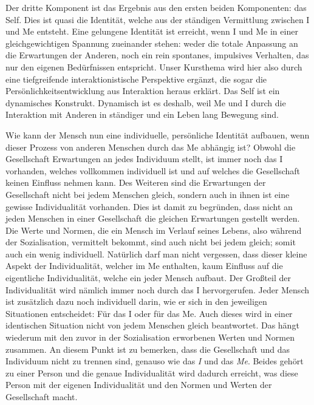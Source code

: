 Der dritte Komponent ist das Ergebnis aus den ersten beiden Komponenten: das Self.
Dies ist quasi die Identität, welche aus der ständigen Vermittlung zwischen I und Me entsteht.
Eine gelungene Identität ist erreicht, wenn I und Me in einer gleichgewichtigen Spannung zueinander stehen: weder die totale Anpassung an die Erwartungen der Anderen, noch ein rein spontanes, impulsives Verhalten, das nur den eigenen Bedürfnissen entspricht.
Unser Kursthema wird hier also durch eine tiefgreifende interaktionistische Perspektive ergänzt, die sogar die Persönlichkeitsentwicklung aus Interaktion heraus erklärt.
Das Self ist ein dynamisches Konstrukt.
Dynamisch ist es deshalb, weil Me und I durch die Interaktion mit Anderen in ständiger und ein Leben lang Bewegung sind.

Wie kann der Mensch nun eine individuelle, persönliche Identität aufbauen, wenn dieser Prozess von anderen Menschen durch das Me abhängig ist?
Obwohl die Gesellschaft Erwartungen an jedes Individuum stellt, ist immer noch das I vorhanden, welches vollkommen individuell ist und auf welches die Gesellschaft keinen Einfluss nehmen kann.
Des Weiteren sind die Erwartungen der Gesellschaft nicht bei jedem Menschen gleich, sondern auch in ihnen ist eine gewisse Individualität vorhanden.
Dies ist damit zu begründen, dass nicht an jeden Menschen in einer Gesellschaft die gleichen Erwartungen gestellt werden.
Die Werte und Normen, die ein Mensch im Verlauf seines Lebens, also während der Sozialisation, vermittelt bekommt, sind auch nicht bei jedem gleich; somit auch ein wenig individuell.
Natürlich darf man nicht vergessen, dass dieser kleine Aspekt der Individualität, welcher im Me enthalten, kaum Einfluss auf die eigentliche Individualität, welche ein jeder Mensch aufbaut.
Der Großteil der Individualität wird nämlich immer noch durch das I hervorgerufen.
Jeder Mensch ist zusätzlich dazu noch individuell darin, wie er sich in den jeweiligen Situationen entscheidet: Für das I oder für das Me. Auch dieses wird in einer identischen Situation nicht von jedem Menschen gleich beantwortet. Das hängt wiederum mit den zuvor in der Sozialisation erworbenen Werten und Normen zusammen.
An diesem Punkt ist zu bemerken, dass die Gesellschaft und das Individuum nicht zu trennen sind, genauso wie das \emph{I} und das \emph{Me}.
Beides gehört zu einer Person und die genaue Individualität wird dadurch erreicht, was diese Person mit der eigenen Individualität und den Normen und Werten der Gesellschaft macht.

